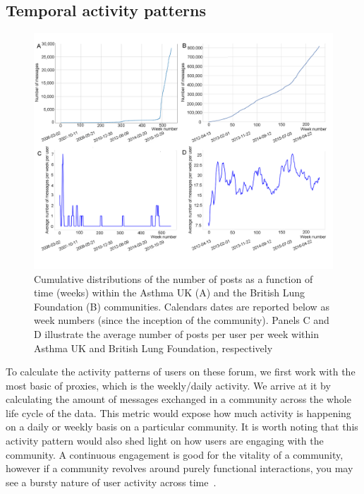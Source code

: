 \subsection{Temporal activity patterns}
\label{sec:activity}
\begin{figure}[!ht]
    \centering
    \includegraphics[width=\textwidth ]{Activity.png}
    \caption{Cumulative distributions of the number of posts as a function of time (weeks) within the Asthma UK (A) and the British Lung Foundation (B) communities. Calendars dates are reported below as week numbers (since the inception of the community). Panels C and D illustrate the average number of posts per user per week within Asthma UK and British Lung Foundation, respectively}        \label{fig:activity}
\end{figure}
To calculate the activity patterns of users on these forum, we first work with the most basic of proxies, which is the weekly/daily activity. We arrive at it by calculating the amount of messages exchanged in a community across the whole life cycle of the data. This metric would expose how much activity is happening on a daily or weekly basis on a particular community. It is worth noting that this activity pattern would also shed light on how users are engaging with the community. A continuous engagement is good for the vitality of a community, however if a community revolves around purely functional interactions, you may see a bursty nature of user activity across time~\cite{panzarasa2015emergence}. 

